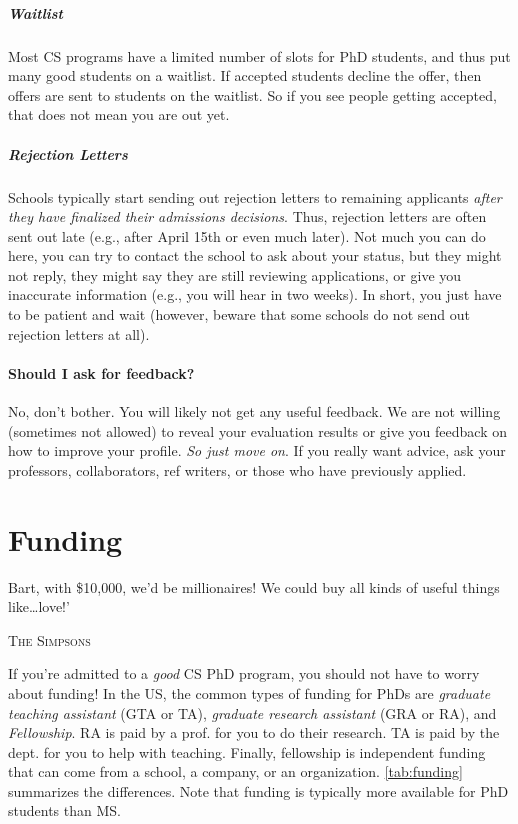 \documentclass[oneside,11pt,dvipsnames]{book}
\def\chapterinfo#1{%
  \addcontentsline{toc}{chapterinfo}{%
    \noexpand\numberline{}\color{black}{#1}}%
}
\begin{document}
\paragraph{Waitlist} Most CS programs have a limited number of slots for PhD students, and thus put many good students on a waitlist.  If accepted students decline the offer, then offers are sent to students on the waitlist. So if you see people getting accepted, that does not mean you are out yet.

\paragraph{Rejection Letters} Schools typically start sending out rejection letters to remaining applicants \emph{after they have finalized their admissions decisions}. Thus, rejection letters are often sent out late (e.g., after April 15th or even much later). Not much you can do here, you can try to contact the school to ask about your status, but they might not reply, they might say they are still reviewing applications, or give you inaccurate information (e.g., you will hear in two weeks). In short, you just have to be patient and wait (however, beware that some schools do not send out rejection letters at all).



\subsubsection{Should I ask for feedback?}
No, don't bother.  You will likely not get any useful feedback.  We are not willing (sometimes not allowed) to reveal your evaluation results or give you feedback on how to improve your profile. \emph{So just move on}.  If you really want advice, ask your professors, collaborators, ref writers, or those who have previously applied.


\chapter{Funding}\label{sec:funding}

\chapterinfo{TAs, RAs, and fellowships are main funding sources for PhDs.  TAs are provided by the department to help with classes. RAs are given by profs. to help with their research.  Fellowships, provided by the university, department, or external sources such as government or industry, give move flexibility but can be very competitive.}

\epigraph{Bart, with \$10,000, we’d be millionaires! We could buy all kinds of useful things like…love!’}{\textsc{The Simpsons}}
If you're admitted to a \emph{good} CS PhD program, you should not have to worry about funding!
In the US, the common types of funding for PhDs are \emph{graduate teaching assistant} (GTA or TA), \emph{graduate research assistant} (GRA or RA), and \emph{Fellowship}.
RA is paid by a prof. for you to do their research. TA is paid by the dept. for you to help with teaching. Finally, fellowship is independent funding that can come from a school, a company, or an organization. \autoref{tab:funding} summarizes the differences.
Note that funding is typically more available for PhD students than
MS.
\end{document}
